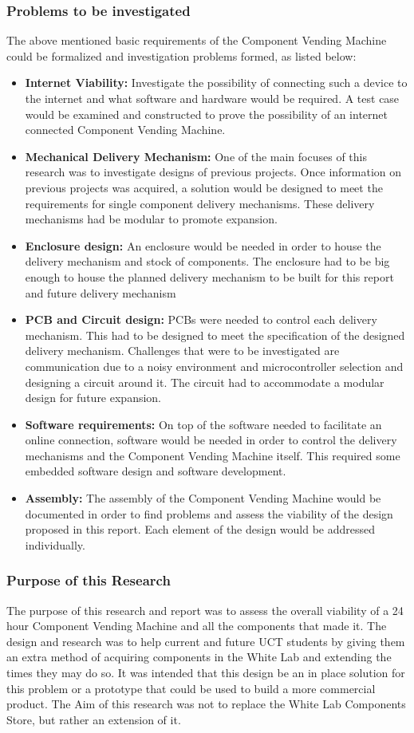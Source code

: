 \documentclass[a4paper,11pt]{article}
\numberwithin{figure}{section}
\numberwithin{table}{section}
\begin{document}
		\subsubsection{Problems to be investigated}
The above mentioned basic requirements of the Component Vending Machine could be formalized and investigation problems formed, as listed below:
\begin{itemize}
\item \textbf{Internet Viability:} Investigate the possibility of connecting such a device to the internet and what software and hardware would be required. A test case would be examined and constructed to prove the possibility of an internet connected Component Vending Machine.
\item \textbf{Mechanical Delivery Mechanism:} One of the main focuses of this research was to investigate designs of previous projects. Once information on previous projects was acquired, a solution would be designed to meet the requirements for single component delivery mechanisms. These delivery mechanisms had be modular to promote expansion.
\item \textbf{Enclosure design:} An enclosure would be needed in order to house the delivery mechanism and stock of components. The enclosure had to be big enough to house the planned delivery mechanism to be built for this report and future delivery mechanism
\item \textbf{PCB and Circuit design:} PCBs were needed to control each delivery mechanism. This had to be designed to meet the specification of the designed delivery mechanism. Challenges that were to be investigated are communication due to a noisy environment and microcontroller selection and designing a circuit around it. The circuit had to accommodate a modular design for future expansion.
\item \textbf{Software requirements:} On top of the software needed to facilitate an online connection, software would be needed in order to control the delivery mechanisms and the Component Vending Machine itself. This required some embedded software design and software development. 
\item \textbf{Assembly:} The assembly of the Component Vending Machine would be documented in order to find problems and assess the viability of the design proposed in this report. Each element of the design would be addressed individually.
\end{itemize}
		\subsubsection{Purpose of this Research}
The purpose of this research and report was to assess the overall viability of a 24 hour Component Vending Machine and all the components that made it. The design and research was to help current and future UCT students by giving them an extra method of acquiring components in the White Lab and extending the times they may do so. It was intended that this design be an in place solution for this problem or a prototype that could be used to build a more commercial product. The Aim of this research was not to replace the White Lab Components Store, but rather an extension of it.
\end{document}
